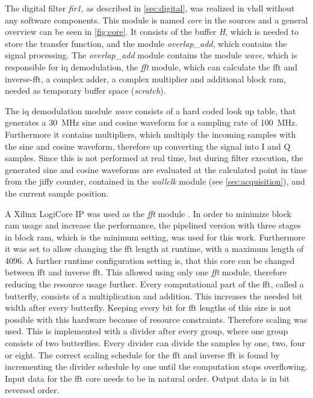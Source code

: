 \documentclass[12pt,a4paper,parskip=full,abstract=true,BCOR=12mm,twoside,open=right]{scrreprt}
\def\device#1{\textit{#1}}
\begin{document}
The digital filter \device{fir1}, as described in \cref{sec:digital}, was
realized in \gls{vhdl} without any software components. This module is named
\device{core} in the sources and a general overview can be seen in \cref{fig:core}.
It consists of the buffer \device{H}, which is needed to store the transfer
function, and the module \device{overlap\_add}, which contains the signal
processing. The \device{overlap\_add}
module contains the module \device{wave}, which is responsible for \gls{iq}
demodulation, the \device{fft} module, which can calculate the \gls{fft} and
inverse-\gls{fft}, a complex adder, a complex multiplier and additional block
\gls{ram}, needed as temporary buffer space (\device{scratch}).

The \gls{iq} demodulation module \device{wave} consists of a hard coded look up
table, that generates a \SI{30}{\mega\hertz} sine and cosine waveform for
a sampling rate of \SI{100}{\mega\hertz}. Furthermore it contains multipliers,
which multiply the incoming samples with the sine and cosine waveform, therefore
up converting the signal into I and Q samples. Since this is not performed
at real time, but during filter execution, the generated sine and
cosine waveforms are evaluated at the calculated point in time from the
jiffy counter, contained in the \device{wallclk} module (see \cref{sec:acquisition}), and the current sample position.

A Xilinx LogiCore IP was used as the \device{fft} module \cite{xilinx_fft}. In
order to minimize block \gls{ram} usage and increase the performance, the
pipelined version with three stages in block \gls{ram}, which is the minimum
setting, was used for this work. Furthermore it was set to allow changing the
\gls{fft} length at runtime, with a maximum length of 4096. A further runtime configuration
setting is, that this core can be changed between \gls{fft} and inverse \gls{fft}. This
allowed using only one \device{fft} module, therefore reducing the resource usage further. Every
computational part of the \gls{fft}, called a butterfly, consists of a multiplication
and addition. This increases the needed bit width after every butterfly.
Keeping every bit for \gls{fft} lengths of this size is not possible with this hardware
because of resource constraints. Therefore scaling was used. This is implemented
with a divider after every group, where one group consists of two butterflies.
Every divider can divide the samples by one, two, four or eight. The correct
scaling schedule for the \gls{fft} and inverse \gls{fft} is found by incrementing
the divider schedule by one until the computation stops overflowing. Input
data for the \gls{fft} core needs to be in natural order. Output data is in
bit reversed order.
\end{document}
